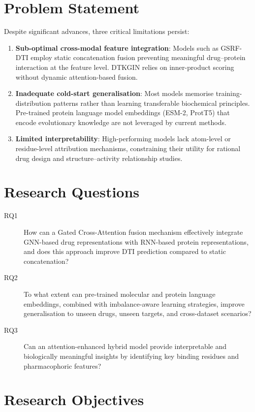\documentclass[12pt,a4paper,oneside]{report}
\begin{document}
\section{Problem Statement}

Despite significant advances, three critical limitations persist:
\begin{enumerate}[leftmargin=1.5em]
  \item \textbf{Sub-optimal cross-modal feature integration}: Models such as GSRF-DTI \citep{zhu2024} employ static concatenation fusion preventing meaningful drug--protein interaction at the feature level. DTKGIN \citep{luo2024dtkgin} relies on inner-product scoring without dynamic attention-based fusion.
  \item \textbf{Inadequate cold-start generalisation}: Most models memorise training-distribution patterns rather than learning transferable biochemical principles. Pre-trained protein language model embeddings (ESM-2, ProtT5) that encode evolutionary knowledge are not leveraged by current methods.
  \item \textbf{Limited interpretability}: High-performing models lack atom-level or residue-level attribution mechanisms, constraining their utility for rational drug design and structure--activity relationship studies.
\end{enumerate}

\section{Research Questions}

\begin{description}
  \item[RQ1] How can a Gated Cross-Attention fusion mechanism effectively integrate GNN-based drug representations with RNN-based protein representations, and does this approach improve DTI prediction compared to static concatenation?
  \item[RQ2] To what extent can pre-trained molecular and protein language embeddings, combined with imbalance-aware learning strategies, improve generalisation to unseen drugs, unseen targets, and cross-dataset scenarios?
  \item[RQ3] Can an attention-enhanced hybrid model provide interpretable and biologically meaningful insights by identifying key binding residues and pharmacophoric features?
\end{description}

\section{Research Objectives}
\end{document}
